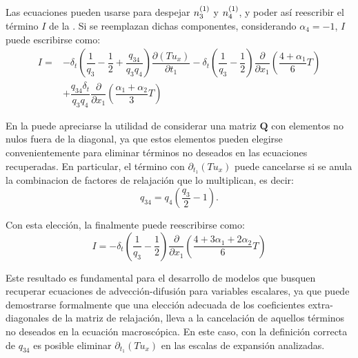 Las ecuaciones  pueden usarse para despejar $n_{3}^{(1)}$ y $n_{4}^{(1)}$, y poder as\'i reescribir el t\'ermino $I$ de la . Si se reemplazan dichas componentes, considerando $\alpha_4 = -1$, $I$ puede escribirse como:
\begin{equation}
\begin{aligned}
	I =& -\delta_t \left( \dfrac{1}{q_3} - \dfrac{1}{2}  + \dfrac{q_{34}}{q_3 q_4}  \right) \dfrac{\partial (Tu_x)}{\partial t_1} - \delta_t \left( \dfrac{1}{q_3} - \dfrac{1}{2} \right) \dfrac{\partial}{\partial x_1} \left(\dfrac{4+\alpha_1}{6} T \right) \\
	&+ \dfrac{q_{34}\delta_t}{q_3q_4}\dfrac{\partial}{\partial x_1} \left(\dfrac{\alpha_1+\alpha_2}{3} T \right)
	\label{eq:I_0}
\end{aligned}
\end{equation}


En la  puede apreciarse la utilidad de considerar una matriz $\bm{Q}$ con elementos no nulos fuera de la diagonal, ya que estos elementos pueden elegirse convenientemente para eliminar t\'erminos no deseados en las ecuaciones recuperadas. En particular, el t\'ermino con $\partial_{t_1}(Tu_x)$ puede cancelarse si se anula la combinacion de factores de relajaci\'on que lo multiplican, es decir:
\begin{equation}
	q_{34} = q_4 \left( \dfrac{q_3}{2} - 1 \right).
\end{equation}

Con esta elecci\'on, la  finalmente puede reescribirse como:
\begin{equation}
	I = -\delta_t \left( \dfrac{1}{q_3} - \dfrac{1}{2} \right) \dfrac{\partial}{\partial x_1} \left(\dfrac{4+3\alpha_1 + 2\alpha_2}{6} T \right)
	\label{eq:I_1}
\end{equation}

Este resultado es fundamental para el desarrollo de modelos que busquen recuperar ecuaciones de advecci\'on-difusi\'on para variables escalares, ya que puede demostrarse formalmente que una elecci\'on adecuada de los coeficientes extra-diagonales de la matriz de relajaci\'on, lleva a la cancelaci\'on de aquellos t\'erminos no deseados en la ecuaci\'on macrosc\'opica. En este caso, con la definici\'on correcta de $q_{34}$ es posible eliminar $\partial_{t_1}(Tu_x)$ en las escalas de expansi\'on analizadas.

